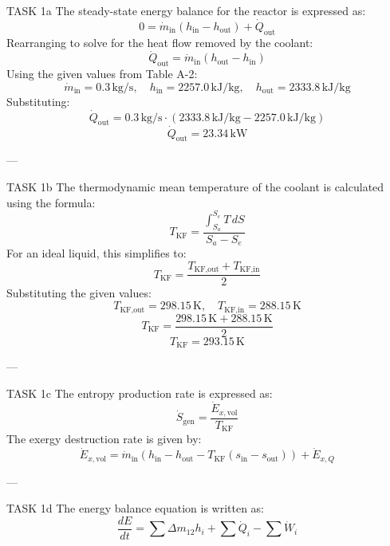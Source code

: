 TASK 1a  
The steady-state energy balance for the reactor is expressed as:  
\[
0 = \dot{m}_{\text{in}} \left( h_{\text{in}} - h_{\text{out}} \right) + \dot{Q}_{\text{out}}
\]  
Rearranging to solve for the heat flow removed by the coolant:  
\[
\dot{Q}_{\text{out}} = \dot{m}_{\text{in}} \left( h_{\text{out}} - h_{\text{in}} \right)
\]  
Using the given values from Table A-2:  
\[
\dot{m}_{\text{in}} = 0.3 \, \text{kg/s}, \quad h_{\text{in}} = 2257.0 \, \text{kJ/kg}, \quad h_{\text{out}} = 2333.8 \, \text{kJ/kg}
\]  
Substituting:  
\[
\dot{Q}_{\text{out}} = 0.3 \, \text{kg/s} \cdot \left( 2333.8 \, \text{kJ/kg} - 2257.0 \, \text{kJ/kg} \right)
\]  
\[
\dot{Q}_{\text{out}} = 23.34 \, \text{kW}
\]  

---

TASK 1b  
The thermodynamic mean temperature of the coolant is calculated using the formula:  
\[
T_{\text{KF}} = \frac{\int_{S_a}^{S_e} T \, dS}{S_a - S_e}
\]  
For an ideal liquid, this simplifies to:  
\[
T_{\text{KF}} = \frac{T_{\text{KF,out}} + T_{\text{KF,in}}}{2}
\]  
Substituting the given values:  
\[
T_{\text{KF,out}} = 298.15 \, \text{K}, \quad T_{\text{KF,in}} = 288.15 \, \text{K}
\]  
\[
T_{\text{KF}} = \frac{298.15 \, \text{K} + 288.15 \, \text{K}}{2}
\]  
\[
T_{\text{KF}} = 293.15 \, \text{K}
\]  

---

TASK 1c  
The entropy production rate is expressed as:  
\[
\dot{S}_{\text{gen}} = \frac{\dot{E}_{x,\text{vol}}}{T_{\text{KF}}}
\]  
The exergy destruction rate is given by:  
\[
\dot{E}_{x,\text{vol}} = \dot{m}_{\text{in}} \left( h_{\text{in}} - h_{\text{out}} - T_{\text{KF}} \left( s_{\text{in}} - s_{\text{out}} \right) \right) + \dot{E}_{x,Q}
\]  

---

TASK 1d  
The energy balance equation is written as:  
\[
\frac{dE}{dt} = \sum \Delta m_{12} h_{i} + \sum \dot{Q}_{i} - \sum \dot{W}_{i}
\]  